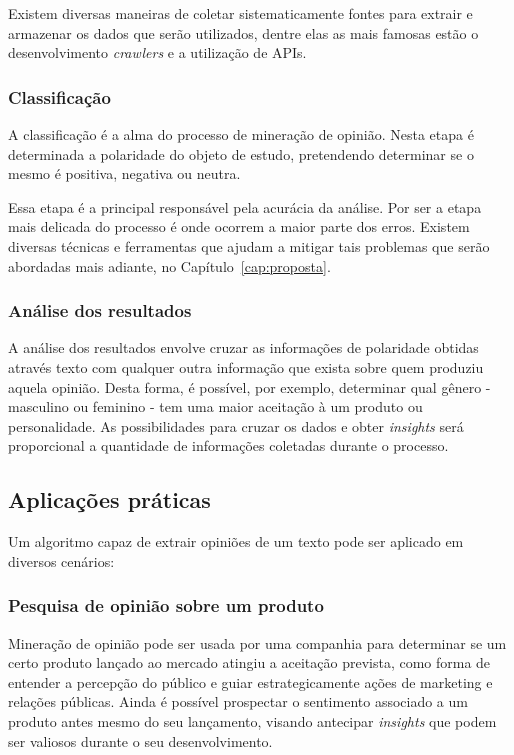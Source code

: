 Existem diversas maneiras de coletar sistematicamente fontes para extrair e armazenar os dados que serão utilizados, dentre elas as mais famosas estão o desenvolvimento \textit{crawlers} e a utilização de APIs.

\subsubsection{Classificação}

A classificação é a alma do processo de mineração de opinião. Nesta etapa é determinada a polaridade do objeto de estudo, pretendendo determinar se o mesmo é positiva, negativa ou neutra.

Essa etapa é a principal responsável pela acurácia da análise. Por ser a etapa mais delicada do processo é onde ocorrem a maior parte dos erros. Existem diversas técnicas e ferramentas que ajudam a mitigar tais problemas que serão abordadas mais adiante, no Capítulo~\ref{cap:proposta}.

\subsubsection{Análise dos resultados}

A análise dos resultados envolve cruzar as informações de polaridade obtidas através texto com qualquer outra informação que exista sobre quem produziu aquela opinião. Desta forma, é possível, por exemplo, determinar qual gênero - masculino ou feminino - tem uma maior aceitação à um produto ou personalidade. As possibilidades para cruzar os dados e obter \textit{insights} será proporcional a quantidade de informações coletadas durante o processo.

\subsection{Aplicações práticas}

Um algoritmo capaz de extrair opiniões de um texto pode ser aplicado em diversos cenários:

\subsubsection{Pesquisa de opinião sobre um produto}

Mineração de opinião pode ser usada por uma companhia para determinar se um certo produto lançado ao mercado atingiu a aceitação prevista, como forma de entender a percepção do público e guiar estrategicamente ações de marketing e relações públicas. Ainda é possível prospectar o sentimento associado a um produto antes mesmo do seu lançamento, visando antecipar \textit{insights} que podem ser valiosos durante o seu desenvolvimento.

